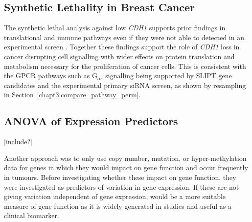 \subsection{Synthetic Lethality in Breast Cancer}

The \gls{synthetic lethal} analysis against low \textit{CDH1}  supports prior findings in translational and immune pathways even if they were not able to detected in an experimental screen \citep{Telford2015}. Together these findings support the role of \textit{CDH1} loss in cancer disrupting cell signalling with wider effects on protein translation and metabolism necessary for the proliferation of cancer cells. This is consistent with the \gls{GPCR} pathways such as G$_{\alpha s}$ signalling being supported by \gls{SLIPT} gene candidates and the experimental primary \gls{siRNA} screen, as shown by resampling in Section~\ref{chapt3:compare_pathway_perm}.


\FloatBarrier



\iffalse
\subsection{ANOVA of Expression Predictors}
[include?]

Another approach was to only use \gls{copy number}, \gls{mutation}, or hyper-methylation data for genes in which they would impact on gene function and occur frequently in tumours. Before investigating whether these impact on gene function, they were investigated as predictors of variation in \gls{gene expression}. If these are not giving variation independent of \gls{gene expression},  would be a more suitable measure of gene function as it is widely generated in studies and useful as a clinical biomarker.

